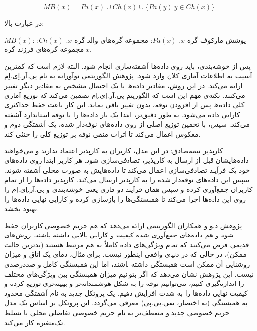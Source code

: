 \begin{equation}
MB(x) = Pa(x) \cup Ch(x) \cup \{Pa(y)|y \in Ch(x)\}
\end{equation}

در عبارت بالا:

 $MB(x)$: پوشش مارکوف گره $x$.
 $Pa(x)$: مجموعه گره‌های والد گره $x$.
 $Ch(x)$: مجموعه گره‌های فرزند گره $x$.



پس از خوشه‌بندی، باید روی داده‌ها آشفته‌سازی انجام شود. البته لازم است که کمترین آسیب به اطلاعات آماری کلان وارد شود. پژوهش الگوریتمی نوآورانه به نام پی.آر.اِی.اِم ارائه می‌کند. در این روش، مقادیر داده‌ها با یک احتمال مشخص به مقادیر دیگر تغییر می‌کنند. نکته‌ی مهم این است که الگوریتم پی.آر.اِی.اِم تضمین می‌کند که توزیع آماری کلی داده‌ها پس از افزودن نوفه، بدون تغییر باقی بماند. این کار باعث حفظ حداکثری کارایی داده می‌شود. به طور دقیق‌تر، ابتدا یک بار داده‌ها را با نوفه استاندارد آشفته می‌کند. سپس، با تخمین توزیع اصلی از روی داده‌های نوفه‌دار شده، یک آشفتگی دوم و معکوس اعمال می‌کند تا اثرات منفی نوفه بر توزیع کلی را خنثی کند.

 کارپذیر نیمه‌صادق: در این مدل، کاربران به کارپذیر اعتماد ندارند و می‌خواهند داده‌هایشان قبل از ارسال به کارپذیر، تصادفی‌سازی شود. هر کاربر ابتدا روی داده‌های خود یک فرآیند تصادفی‌سازی اعمال می‌کند تا داده‌هایش به صورت محلی آشفته شوند. سپس این داده‌های نوفه‌دار شده را به کارپذیر ارسال می‌کند. کارپذیر داده‌ها را از تمام کاربران جمع‌آوری کرده و سپس همان فرآیند دو فازی یعنی خوشه‌بندی و  پی.آر.اِی.اِم را روی این داده‌ها اجرا می‌کند تا همبستگی‌ها را بازسازی کرده و کارایی نهایی داده‌ها را بهبود بخشد.



پژوهش دیو و همکاران  الگوریتمی ارائه می‌دهد که هم حریم خصوصی کاربران حفظ شود و هم داده‌های جمع‌آوری شده کیفیت و کارایی بالایی داشته باشند. روش‌های قدیمی فرض می‌کنند که تمام ویژگی‌های داده کاملاً به هم مرتبط هستند (بدترین حالت ممکن)، در حالی که در دنیای واقعی اینطور نیست. برای مثال، دمای یک اتاق و میزان روشنایی آن ممکن است همبستگی داشته باشند، اما این همبستگی کامل و صددرصدی نیست. این پژوهش نشان می‌دهد که اگر بتوانیم میزان همبستگی بین ویژگی‌های مختلف را اندازه‌گیری کنیم، می‌توانیم نوفه را به شکل هوشمندانه‌تر و بهینه‌تری توزیع کرده و کیفیت نهایی داده‌ها را به شدت افزایش دهیم. یک پروتکل جدید به نام آشفتگی محدود به همبستگی (به اختصار، سی.بی.پی) معرفی می‌گردد. این پروتکل بر اساس یک مدل حریم خصوصی جدید و منعطف‌تر به نام حریم خصوصی تفاضلی محلی با تسلط تک‌متغیره کار می‌کند. 

